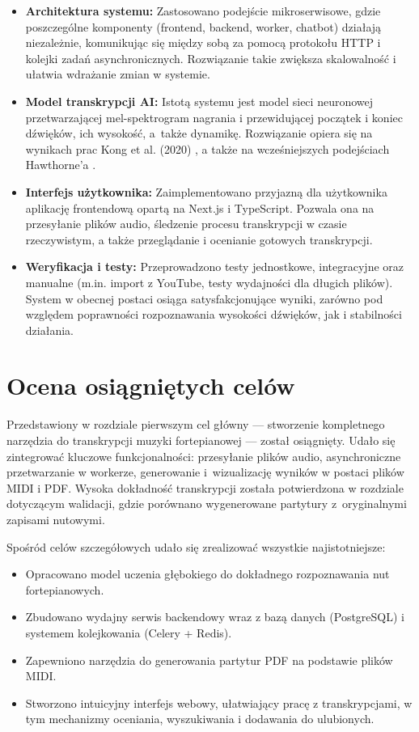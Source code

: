 \documentclass[a4paper,twoside,12pt]{book}
\begin{document}
\begin{itemize}
    \item \textbf{Architektura systemu:} Zastosowano podejście mikroserwisowe, gdzie poszczególne komponenty (frontend, backend, worker, chatbot) działają niezależnie, komunikując się między sobą za pomocą protokołu HTTP i kolejki zadań asynchronicznych. Rozwiązanie takie zwiększa skalowalność i ułatwia wdrażanie zmian w systemie.
    \item \textbf{Model transkrypcji AI:} Istotą systemu jest model sieci neuronowej przetwarzającej mel-spektrogram nagrania i przewidującej początek i koniec dźwięków, ich wysokość, a~także dynamikę. Rozwiązanie opiera się na wynikach prac Kong et al. (2020) \cite{bib:kong2020high}, a także na wcześniejszych podejściach Hawthorne'a \cite{bib:hawthorne2018onsets}.
    \item \textbf{Interfejs użytkownika:} Zaimplementowano przyjazną dla użytkownika aplikację frontendową opartą na Next.js i TypeScript. Pozwala ona na przesyłanie plików audio, śledzenie procesu transkrypcji w czasie rzeczywistym, a także przeglądanie i ocenianie gotowych transkrypcji.
    \item \textbf{Weryfikacja i testy:} Przeprowadzono testy jednostkowe, integracyjne oraz manualne (m.in. import z YouTube, testy wydajności dla długich plików). System w obecnej postaci osiąga satysfakcjonujące wyniki, zarówno pod względem poprawności rozpoznawania wysokości dźwięków, jak i stabilności działania.
\end{itemize}

\section{Ocena osiągniętych celów}
Przedstawiony w rozdziale pierwszym cel główny — stworzenie kompletnego narzędzia do transkrypcji muzyki fortepianowej — został osiągnięty. Udało się zintegrować kluczowe funkcjonalności: przesyłanie plików audio, asynchroniczne przetwarzanie w workerze, generowanie i~wizualizację wyników w postaci plików MIDI i PDF. Wysoka dokładność transkrypcji została potwierdzona w rozdziale dotyczącym walidacji, gdzie porównano wygenerowane partytury z~oryginalnymi zapisami nutowymi.

Spośród celów szczegółowych udało się zrealizować wszystkie najistotniejsze:
\begin{itemize}
  \item Opracowano model uczenia głębokiego do dokładnego rozpoznawania nut fortepianowych.
  \item Zbudowano wydajny serwis backendowy wraz z bazą danych (PostgreSQL) i systemem kolejkowania (Celery + Redis).
  \item Zapewniono narzędzia do generowania partytur PDF na podstawie plików MIDI.
  \item Stworzono intuicyjny interfejs webowy, ułatwiający pracę z transkrypcjami, w tym mechanizmy oceniania, wyszukiwania i dodawania do ulubionych.
\end{itemize}
\end{document}
